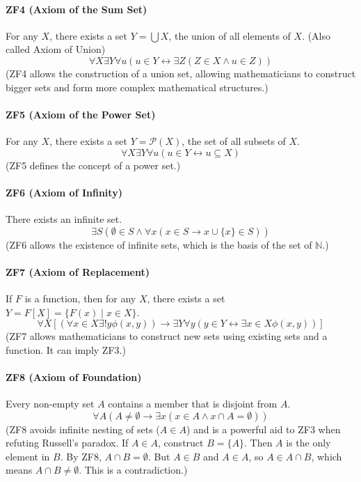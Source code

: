 \paragraph{ZF4 (Axiom of the Sum Set)}
For any $X$, there exists a set $Y = \bigcup X$, the union of all elements of $X$. (Also called Axiom of Union)
$$ \forall X \exists Y \forall u (u \in Y \leftrightarrow \exists Z (Z \in X \wedge u \in Z)) $$
(ZF4 allows the construction of a union set, allowing mathematicians to construct bigger sets and form more complex mathematical structures.)

\paragraph{ZF5 (Axiom of the Power Set)}
For any $X$, there exists a set $Y = \mathcal{P}(X)$, the set of all subsets of $X$.
$$ \forall X \exists Y \forall u (u \in Y \leftrightarrow u \subseteq X) $$
(ZF5 defines the concept of a power set.)

\paragraph{ZF6 (Axiom of Infinity)}
There exists an infinite set.
$$ \exists S (\emptyset \in S \wedge \forall x (x \in S \to x \cup \{x\} \in S)) $$
(ZF6 allows the existence of infinite sets, which is the basis of the set of $\mathbb{N}$.)

\paragraph{ZF7 (Axiom of Replacement)}
If $F$ is a function, then for any $X$, there exists a set $Y = F[X] = \{F(x) \mid x \in X\}$.
$$ \forall X [(\forall x \in X \exists! y \phi(x,y)) \to \exists Y \forall y (y \in Y \leftrightarrow \exists x \in X \phi(x,y))] $$
(ZF7 allows mathematicians to construct new sets using existing sets and a function. It can imply ZF3.)

\paragraph{ZF8 (Axiom of Foundation)}
Every non-empty set $A$ contains a member that is disjoint from $A$.
$$ \forall A (A \ne \emptyset \to \exists x (x \in A \wedge x \cap A = \emptyset)) $$
(ZF8 avoids infinite nesting of sets ($A \in A$) and is a powerful aid to ZF3 when refuting Russell's paradox. If $A \in A$, construct $B=\{A\}$. Then $A$ is the only element in $B$. By ZF8, $A \cap B = \emptyset$. But $A \in B$ and $A \in A$, so $A \in A \cap B$, which means $A \cap B \ne \emptyset$. This is a contradiction.)

